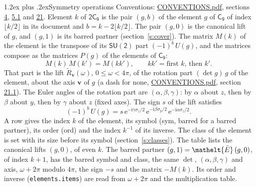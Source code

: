 \documentclass[10pt,a4paper]{article}
\makeatletter
\renewcommand\section{\@startsection{section}{1}{\z@}{-3ex plus -1ex minus -.2ex}%
  {1.2ex plus .2ex}{\normalfont\large\sffamily\bfseries\color{parttitle}}}
\numberwithin{equation}{section}
\newcommand{\eltfont}[1]{{\let\sigma\eltsigma\mathelt{#1}}}
\newcommand{\grp}[1]{\mathsf{#1}}
\newcommand{\elt}[1]{\eltfont{#1}}
\newcommand{\vv}{\mathbf{v}}
\newcommand{\iunit}{\mathrm{i}}
\newcommand{\expe}{\mathrm{e}}
\newcommand{\barred}[1]{\bar{#1}}
\newcommand{\lift}[1]{\tilde{#1}}
\newcommand{\pauli}[1]{\sigma_{#1}}
\makeatother
\begin{document}
\section{Symmetry operations}\label{s:elements}
Conventions: \href{../../CONVENTIONS.pdf}{CONVENTIONS.pdf}, sections \href{../../../rotation/CONVENTIONS.pdf\#conv.4}{4}, \href{../../../rotation/CONVENTIONS.pdf\#conv.5.1}{5.1} and \href{../../CONVENTIONS.pdf\#conv.21}{21}.
\leavevmode\label{n:index.element}\label{n:element.g}Element $k$ of $\grp{2C_{9}}$ is the pair $(g, b)$ of the element $g$ of \href{../../../rotation/data/pdf/C9.pdf}{$\grp{C_{9}}$} of index $\lfloor k/2\rfloor$ in its document and $b = k - 2\lfloor k/2\rfloor$. The pair $(g, 0)$ is the canonical lift of $g$, and $(g, 1)$ is its barred partner (section~\ref{s:cover}). \label{n:matrix.element.pin}\label{n:matrix.element}The matrix $M(k)$ of the element is the transpose of its $\grp{SU(2)}$ part $(-1)^{b}\,U(g)$, and the matrices compose as the matrices $P(g)$ of the elements of $\grp{C_{9}}$:
\begin{equation}\label{e:mprod}M(k)\,M(k') = M(kk'),\qquad kk' = \text{first } k\text{, then } k'.\end{equation}
\leavevmode\label{n:angle.omega}\label{n:vector.axis}\label{n:vector.pole}That part is the lift $\lift{R}_{\vv}(\omega)$, $0 \le \omega < 4\pi$, of the rotation part $(\det g)\,g$ of the element, about the axis $\vv$ of $g$ (a dash for none, \href{../../CONVENTIONS.pdf}{CONVENTIONS.pdf}, section \href{../../CONVENTIONS.pdf\#conv.21.1}{21.1}). \label{n:angle.euler.alpha}\label{n:angle.euler.beta}\label{n:angle.euler.gamma}\label{n:vector.coordinates}The Euler angles of the rotation part are $(\alpha,\beta,\gamma)$: by $\alpha$ about $z$, then by $\beta$ about $y$, then by $\gamma$ about $z$ (fixed axes). \label{n:local.euler.sign}The sign $s$ of the lift satisfies
\begin{equation}\label{e:euler}(-1)^{b}\,U(g) = s\,\expe^{-\iunit\gamma\pauli{z}/2}\,\expe^{-\iunit\beta\pauli{y}/2}\,\expe^{-\iunit\alpha\pauli{z}/2}.\end{equation}
\leavevmode\label{n:index.element.inverse}\label{n:head.sym}\label{n:head.ord}A row gives the index $k$ of the element, its symbol (sym, barred for a barred partner), its order (ord) and the index $k^{-1}$ of its inverse. \label{n:head.class}The class of the element is set with its size before its symbol (section~\ref{s:classes}).
The table lists the canonical lifts $(g, 0)$, of even $k$. The barred partner $(g, 1) = \elt{\barred{E}}\,(g, 0)$, of index $k + 1$, has the barred symbol and class, the same $\det$, $(\alpha,\beta,\gamma)$ and axis, $\omega + 2\pi$ modulo $4\pi$, the sign $-s$ and the matrix $-M(k)$. Its order and inverse (\texttt{elements.items}) are read from $\omega + 2\pi$ and the multiplication table.
\end{document}
